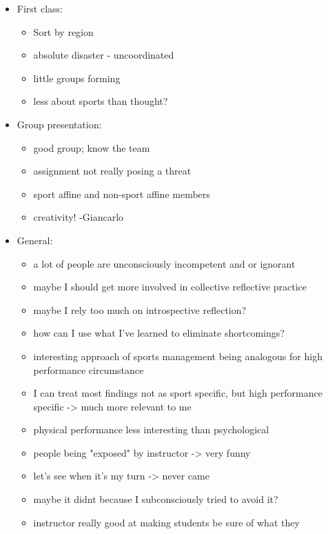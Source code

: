 \documentclass[12pt]{article}
\begin{document}
\begin{itemize}
    \item First class:
        \begin{itemize}
            \item Sort by region
            \item absolute disaster - uncoordinated
            \item little groups forming
            \item less about sports than thought? 
        \end{itemize}
    \item Group presentation:
        \begin{itemize}
            \item good group; know the team
            \item assignment not really posing a threat
            \item sport affine and non-sport affine members
            \item creativity! -Giancarlo 
        \end{itemize}
    \item General:
        \begin{itemize}
            \item a lot of people are unconsciously incompetent and or ignorant
            \item maybe I should get more involved in collective reflective
                practice
            \item maybe I rely too much on introspective reflection?
            \item how can I use what I've learned to eliminate shortcomings?
            \item interesting approach of sports management being analogous for
                high performance circumstance
            \item I can treat most findings not as sport specific, but high
                performance specific -> much more relevant to me
            \item physical performance less interesting than psychological
            \item people being "exposed" by instructor -> very funny
            \item let's see when it's my turn -> never came
            \item maybe it didnt because I subconsciously tried to avoid it?
            \item instructor really good at making students be sure of what they

\end{itemize}
\end{itemize}
\end{document}
